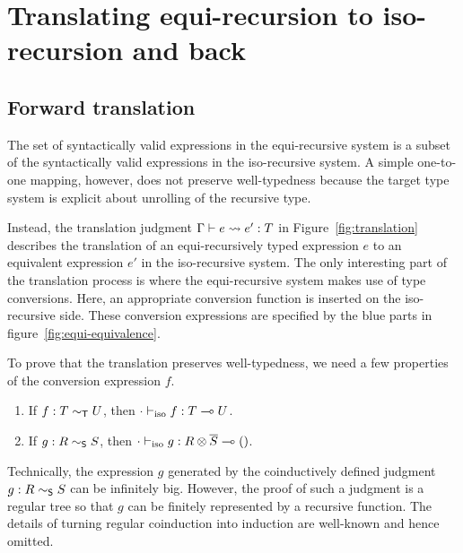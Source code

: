 \section{Translating equi-recursion to iso-recursion and back}

\subsection{Forward translation}
\label{sec:forward}


The set of syntactically valid expressions in the equi-recursive system is a
subset of the syntactically valid expressions in the iso-recursive system. A
simple one-to-one mapping, however, does not preserve well-typedness because
the target type system is explicit about unrolling of the recursive type.



Instead, the translation judgment $\translation e {e'} T$ in
Figure~\ref{fig:translation} describes the translation of an equi-recursively
typed expression $e$ to an equivalent expression $e'$ in the iso-recursive
system. The only interesting part of the translation process is where the
equi-recursive system makes use of type conversions. Here, an appropriate
conversion function is inserted on the iso-recursive side. These
conversion expressions are specified by the blue parts in figure~\ref{fig:equi-equivalence}.
\begin{mathpar}
\end{mathpar}

To prove that the translation preserves well-typedness, we
need a few properties of the conversion expression $f$.
\begin{lemma}
  \begin{enumerate}
  \item If $f : T \eqt U$, then $\typing[\CNil]{\tyIso f}{\TFun TU}$.
  \item If $g : R \eqs S$, then $\typing[\CNil]{\tyIso g}{\TFun{\TPair
      R {\TDual S}} \TUnit}$.
  \end{enumerate}
\end{lemma}
Technically, the expression $g$ generated by the coinductively defined
judgment $g : R \eqs S$ can be infinitely big. However, the proof of
such a judgment is a regular tree so that $g$ can be finitely
represented by a recursive function. The details of turning regular
coinduction into induction are well-known
\cite{DBLP:conf/popl/HengleinN11,DBLP:journals/jfp/GapeyevLP02,DBLP:journals/lmcs/Dagnino21}
and hence omitted.


